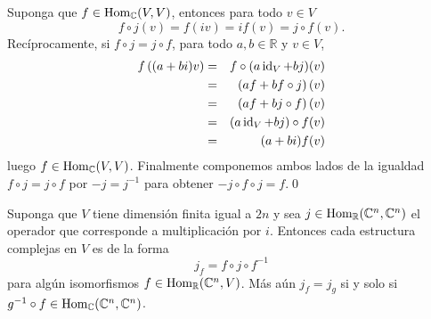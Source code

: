 \dem Suponga que $f\in\operatorname{Hom}_{\mathbb{C}}(V,V)$, entonces para todo $v\in V$
\[
f\circ j(v)=f(iv)=if(v)=j\circ f(v).
\]
Rec\'iprocamente, si $f\circ j=j\circ f$, para todo $a,b\in\mathbb{R}$ y $v\in V$,
\begin{eqnarray*}
f\left((a+bi)v\right) & = & f\circ(a\operatorname{id}_V+bj)(v)\\
 & = & \left(af+bf\circ j\right)(v)\\
 & = & \left(af+bj\circ f\right)(v)\\
 & = & (a\operatorname{id}_V+bj)\circ f(v)\\
 & = & (a+bi)f(v)
\end{eqnarray*}
luego $f\in\operatorname{Hom}_{\mathbb{C}}(V,V)$. Finalmente componemos ambos lados de la igualdad $f\circ j=j\circ f$ por $-j=j^{-1}$ para obtener  $-j\circ f\circ j=f$.\qed

\begin{teo}
Suponga que $V$ tiene dimensi\'on finita igual a $2n$ y sea $j\in\operatorname{Hom}_\mathbb{R}(\mathbb{C}^n,\mathbb{C}^n)$ el operador que corresponde a multiplicaci\'on por $i$. Entonces cada estructura complejas en $V$ es de la forma
$$j_f=f\circ j\circ f^{-1}$$
para alg\'un isomorfismos $f\in\operatorname{Hom}_{\mathbb{R}}(\mathbb{C}^n,V)$. M\'as a\'un $j_f=j_g$ si y solo si $g^{-1}\circ f\in\operatorname{Hom}_{\mathbb{C}}(\mathbb{C}^n,\mathbb{C}^n)$.
\end{teo}

